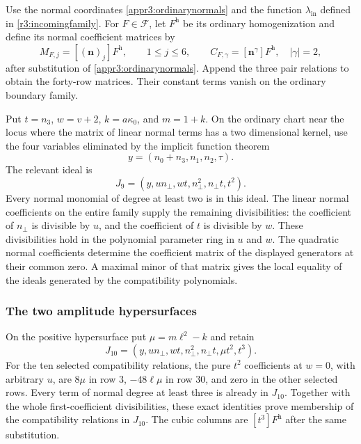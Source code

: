 \documentclass[11pt,a4paper]{article}
\numberwithin{equation}{section}
\theoremstyle{plain}
\theoremstyle{definition}
\theoremstyle{remark}
\begin{document}
Use the normal coordinates \eqref{appr3:ordinarynormals} and the
function $\lambda_{\mathrm{in}}$ defined in \eqref{r3:incomingfamily}. For $F\in\mathscr F$, let $F^{\mathrm h}$ be its ordinary
homogenization and define its normal coefficient matrices by
\[
 M_{F,j}=[(\boldsymbol n)_j]F^{\mathrm h},\qquad 1\le j\le6,\qquad
 C_{F,\gamma}=[\boldsymbol n^\gamma]F^{\mathrm h},\quad |\gamma|=2,
\]
after substitution of \eqref{appr3:ordinarynormals}. Append the three
pair relations to obtain the forty-row matrices. Their constant terms
vanish on the ordinary boundary family.

Put $t=n_3$, $w=v+2$, $k=a\kappa_0 $, and $m=1+k$. On the ordinary
chart near the locus where the matrix of linear normal terms has a two dimensional
kernel, use the four variables eliminated by the implicit function theorem
\[
 y=(n_0+n_3,n_1,n_2,\tau).
\]
The relevant ideal is
\begin{equation}\label{appr3ord:Jnine}
 J_9=(y,un_\perp,wt,n_\perp^2,n_\perp t,t^2).
\end{equation}
Every normal monomial of degree at least two is in this ideal.
The linear normal coefficients on the entire family supply the remaining
divisibilities: the coefficient of $n_\perp$ is divisible by $u$, and
the coefficient of $t$ is divisible by $w$. These divisibilities hold in the polynomial
parameter ring in $u$ and $w$. The quadratic normal
coefficients determine the coefficient matrix of the displayed
generators at their common zero. A maximal minor of that matrix gives
the local equality of the ideals generated by the compatibility polynomials. 

\subsubsection{The two amplitude hypersurfaces}

On the positive hypersurface put $\mu=m\ell^2-k$ and retain
\begin{equation}\label{appr3ord:Jten}
 J_{10}=(y,un_\perp,wt,n_\perp^2,n_\perp t,\mu t^2,t^3).
\end{equation}
For the ten selected compatibility relations, the pure $t^2$ coefficients at
$w=0$, with arbitrary $u$, are $8\mu$ in row $3$,
$-48\ell\mu$ in row $30$, and zero in the other selected rows.
Every term of normal degree at least three is already in $J_{10}$.
Together with the whole first-coefficient divisibilities, these exact
identities prove membership of the compatibility relations in $J_{10}$.
The cubic columns are $[t^3]F^{\mathrm h}$ after the same substitution.
\end{document}
